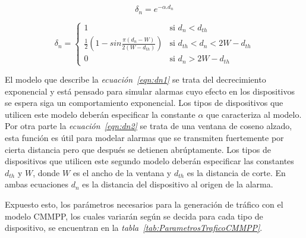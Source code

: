 \begin{equation}
\delta_n = e^{-\alpha.d_{n}}
\label{eqn:dn1}
\end{equation}

\begin{equation}
    \delta_n =
    \begin{cases}
        1  & \text{si $d_n < d_{th}$} \\
        \frac{1}{2}(1-sin\frac{\pi(d_n-W)}{2(W-d_{th})}) & \text{si $d_{th}< d_n < 2W-d_{th}$}\\
        0  & \text{si $d_n > 2W-d_{th}$}
    \end{cases}
    \label{eqn:dn2}
\end{equation}

El modelo que describe la \textit{ecuación~\ref{eqn:dn1}} se trata del decrecimiento exponencial y está pensado para simular alarmas cuyo efecto en los dispositivos se espera siga un comportamiento exponencial. Los tipos de dispositivos que utilicen este modelo deberán especificar la constante $\alpha$ que caracteriza al modelo. Por otra parte la \textit{ecuación~\ref{eqn:dn2}} se trata de una ventana de coseno alzado, esta función es útil para modelar alarmas que se transmiten fuertemente por cierta distancia pero que después se detienen abrúptamente. Los tipos de dispositivos que utilicen este segundo modelo deberán especificar las constantes $d_{th}$ y $W$, donde $W$ es el ancho de la ventana y $d_{th}$ es la distancia de corte. En ambas ecuaciones $d_n$ es la distancia del dispositivo al origen de la alarma.\newline

Expuesto esto, los parámetros necesarios para la generación de tráfico con el modelo CMMPP, los cuales variarán según se decida para cada tipo de dispositivo, se encuentran en la \textit{tabla~\ref{tab:ParametrosTraficoCMMPP}}.\newline

